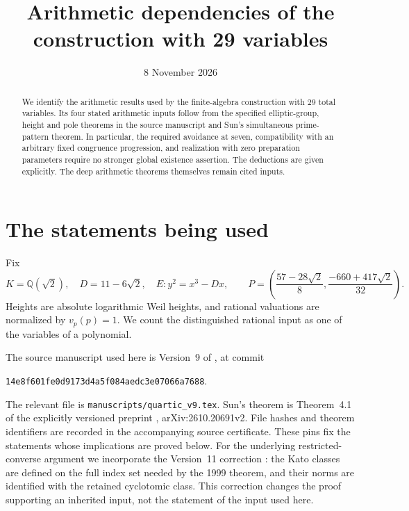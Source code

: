 \documentclass[11pt,a4paper]{article}
\title{Arithmetic dependencies of the construction with 29 variables}
\author{}\date{8 November 2026}
\theoremstyle{remark}\newtheorem{remark}[theorem]{Remark}
\newcommand{\Q}{\mathbb Q}\newcommand{\Z}{\mathbb Z}
\begin{document}
\maketitle
\begin{abstract}
We identify the arithmetic results used by the finite-algebra construction
with 29 total variables. Its four stated arithmetic inputs follow
from the specified elliptic-group, height and pole theorems in the source
manuscript and Sun's simultaneous prime-pattern theorem. In particular,
the required avoidance at seven, compatibility with an arbitrary fixed
congruence progression, and realization with zero preparation parameters
require no stronger global existence assertion. The deductions are given
explicitly. The deep arithmetic theorems themselves remain cited inputs.
\end{abstract}

\section{The statements being used}

Fix
\[
 K=\Q(\sqrt2),\quad D=11-6\sqrt2,\quad E:y^2=x^3-Dx,
 \qquad
 P=\left(\frac{57-28\sqrt2}{8},\frac{-660+417\sqrt2}{32}\right).
\]
Heights are absolute logarithmic Weil heights, and rational valuations
are normalized by $v_p(p)=1$. We count the distinguished rational input
as one of the variables of a polynomial.

The source manuscript used here is Version~9 of \cite{GlazerV9}, at commit
\begin{center}\small\texttt{14e8f601fe0d9173d4a5f084aedc3e07066a7688}.\end{center}
The relevant file is \texttt{manuscripts/quartic\_v9.tex}.
Sun's theorem is Theorem~4.1 of the explicitly versioned preprint
\cite{Sun2026}, arXiv:2610.20691v2. File hashes and theorem identifiers
are recorded in the accompanying source certificate. These pins fix
the statements whose implications are proved below. For the underlying
restricted-converse argument we incorporate the Version~11 correction
\cite{GlazerV11}: the Kato classes are defined on the full index set
needed by the 1999 theorem, and their norms are identified with the
retained cyclotomic class. This correction changes the proof supporting
an inherited input, not the statement of the input used here.
\end{document}
